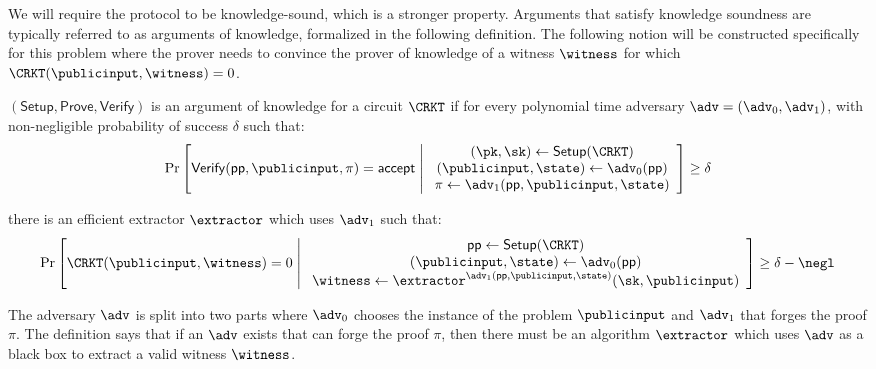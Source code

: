 We will require the protocol to be knowledge-sound, which is a stronger property. Arguments that satisfy knowledge soundness are typically referred to as arguments of knowledge, formalized in the following definition. The following notion will be constructed specifically for this problem where the prover needs to convince the prover of knowledge of a witness $\witness$ for which $\CRKT(\publicinput, \witness) = 0$.

\begin{definition}
    $(\mathsf{Setup}, \mathsf{Prove}, \mathsf{Verify})$ is an argument of knowledge for a circuit $\CRKT$ if for every polynomial time adversary $\adv = (\adv_0, \adv_1)$, with non-negligible probability of success $\delta$ such that:
    \begin{equation}
        \operatorname{Pr}
            \left[
            \mathsf{Verify}(\publicparameter, \publicinput, \pi) = \mathsf{accept}
            \;\middle|\;
            \begin{array}{c}
                (\pk, \sk) \gets \mathsf{Setup}(\CRKT) \\
                (\publicinput, \state) \gets \adv_0(\publicparameter) \\
                \pi \gets \adv_1(\publicparameter, \publicinput, \state) \\ 
            \end{array}
            \right]
            \geq \delta
    \end{equation} 

    there is an efficient extractor $\extractor$ which uses $\adv_1$ such that:
    \begin{equation}
        \operatorname{Pr}
            \left[
            \CRKT(\publicinput, \witness) = 0
            \;\middle|\;
            \begin{array}{c}
                \publicparameter \gets \mathsf{Setup}(\CRKT) \\
                (\publicinput, \state) \gets \adv_0(\publicparameter) \\
                \witness \gets \extractor^{\adv_1(\publicparameter, \publicinput, \state)}(\sk, \publicinput) \\ 
            \end{array}
            \right]
            \geq \delta - \negl
    \end{equation} 
\end{definition}

The adversary $\adv$ is split into two parts where $\adv_0$ chooses the instance of the problem $\publicinput$ and $\adv_1$ that forges the proof $\pi$. The definition says that if an $\adv$ exists that can forge the proof $\pi$, then there must be an algorithm $\extractor$ which uses $\adv$ as a black box to extract a valid witness $\witness$. 

